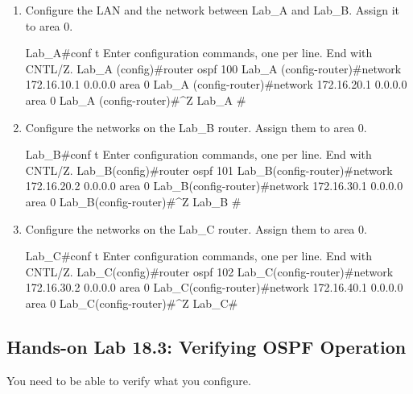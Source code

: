 \begin{enumerate}
\item
  Configure the LAN and the network between Lab\_A and Lab\_B. Assign it
  to area 0.

\begin{cli}
Lab_A#conf t
Enter configuration commands, one per line.
  End with CNTL/Z.
Lab_A (config)#router ospf 100
Lab_A (config-router)#network 172.16.10.1 0.0.0.0 area 0
Lab_A (config-router)#network 172.16.20.1 0.0.0.0 area 0
Lab_A (config-router)#^Z
Lab_A #
\end{cli}
\item
  Configure the networks on the Lab\_B router. Assign them to area 0.

\begin{cli}
Lab_B#conf t
Enter configuration commands, one per line.
  End with CNTL/Z.
Lab_B(config)#router ospf 101
Lab_B(config-router)#network 172.16.20.2 0.0.0.0 area 0
Lab_B(config-router)#network 172.16.30.1 0.0.0.0 area 0
Lab_B(config-router)#^Z
Lab_B #
\end{cli}
\item
  Configure the networks on the Lab\_C router. Assign them to area 0.

\begin{cli}
Lab_C#conf t
Enter configuration commands, one per line.
  End with CNTL/Z.
Lab_C(config)#router ospf 102
Lab_C(config-router)#network 172.16.30.2 0.0.0.0 area 0
Lab_C(config-router)#network 172.16.40.1 0.0.0.0 area 0
Lab_C(config-router)#^Z
Lab_C#
\end{cli}
\end{enumerate}

\subsection[Hands-on Lab 18.3: Verifying OSPF
Operation]{\texorpdfstring{\protect\hypertarget{c18.xhtmlux5cux23c18-sec-23}{}{}Hands-on
Lab 18.3: Verifying OSPF
Operation}{Hands-on Lab 18.3: Verifying OSPF Operation}}

You need to be able to verify what you configure.


